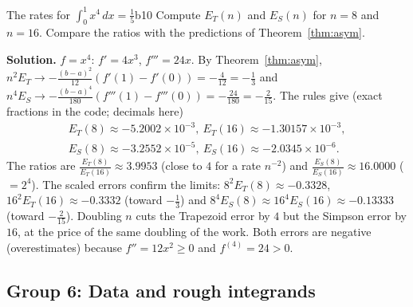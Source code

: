 \documentclass[11pt]{article}
\begin{document}
\begin{exmp}{The rates for $\int_0^1x^4\,dx=\frac15$}{b10}
Compute $E_T(n)$ and $E_S(n)$ for $n=8$ and $n=16$. Compare the ratios with the predictions of Theorem~\ref{thm:asym}.

\textbf{Solution.} $f=x^4$: $f'=4x^3$, $f'''=24x$. By Theorem~\ref{thm:asym}, $n^2E_T\to-\frac{(b-a)^2}{12}(f'(1)-f'(0))=-\frac4{12}=-\frac13$ and $n^4E_S\to-\frac{(b-a)^4}{180}(f'''(1)-f'''(0))=-\frac{24}{180}=-\frac2{15}$. The rules give (exact fractions in the code; decimals here)
\[\begin{gathered}E_T(8)\approx-5.2002\times10^{-3},\ E_T(16)\approx-1.30157\times10^{-3},\\E_S(8)\approx-3.2552\times10^{-5},\ E_S(16)\approx-2.0345\times10^{-6}.\end{gathered}\]
The ratios are $\frac{E_T(8)}{E_T(16)}\approx3.9953$ (close to $4$ for a rate $n^{-2}$) and $\frac{E_S(8)}{E_S(16)}\approx16.0000$ ($=2^4$). The scaled errors confirm the limits: $8^2E_T(8)\approx-0.3328$, $16^2E_T(16)\approx-0.3332$ (toward $-\frac13$) and $8^4E_S(8)\approx16^4E_S(16)\approx-0.13333$ (toward $-\frac2{15}$). Doubling $n$ cuts the Trapezoid error by $4$ but the Simpson error by $16$, at the price of the same doubling of the work. Both errors are negative (overestimates) because $f''=12x^2\ge0$ and $f^{(4)}=24>0$.
\end{exmp}

\subsection*{Group 6: Data and rough integrands}
\end{document}

